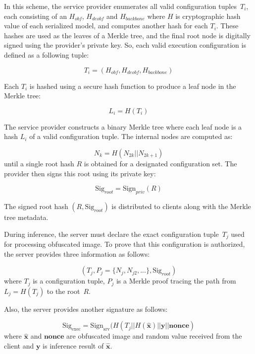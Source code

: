 \documentclass{ieeeaccess}
\begin{document}
In this scheme, the service provider enumerates all valid configuration tuples~$T_{i}$, each consisting of an $H_{obf}$, $H_{deobf}$ and $H_{backbone}$ where $H$ is cryptographic hash value of each serialized model, and computes another hash for each $T_i$. These hashes are used as the leaves of a Merkle tree, and the final root node is digitally signed using the provider's private key. So, each valid execution configuration is defined as a following tuple:

\begin{equation}
    T_i = (H_{obf},H_{deobf},H_{backbone})
\end{equation}

Each $T_{i}$ is hashed using a secure hash function to produce a leaf node in the Merkle tree:

\begin{equation}
    L_i=H(T_i)
\end{equation}

The service provider constructs a binary Merkle tree where each leaf node is a hash $L_i$ of a valid configuration tuple. The internal nodes are computed as:

\begin{equation}
    N_k=H(N_{2k}||N_{2k+1})
\end{equation}
until a single root hash $R$ is obtained for a designated configuration set. The provider then signs this root using its private key:

\begin{equation}
    \textrm{Sig}_{root} = \textrm{Sign}_{priv}(R)
\end{equation}

The signed root hash $(R,\textrm{Sig}_{root})$ is distributed to clients along with the Merkle tree metadata.

During inference, the server must declare the exact configuration tuple~$T_j$ used for processing obfuscated image. To prove that this configuration is authorized, the server provides three information as follows:

\begin{equation}
    (T_j, P_j=\{N_j,N_{j2},...\}, \textrm{Sig}_{root})
\end{equation}
where $T_j$ is a configuration tuple, $P_j$ is a Merkle proof tracing the path from $L_j=H(T_j)$ to the root~$R$.

Also, the server provides another signature as follows:

\begin{equation}
    \textrm{Sig}_{\text{exec}} = \textrm{Sign}_{\text{srv}}(H(T_j||H(\hat{\textbf{x}})||\textbf{y}||\textbf{nonce})
\end{equation}
where $\hat{\textbf{x}}$ and $\textbf{nonce}$ are obfuscated image and random value received from the client and $\textbf{y}$ is inference result of $\hat{\textbf{x}}$. 
\end{document}
